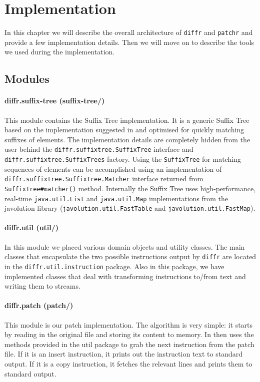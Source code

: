 \section{Implementation}

In this chapter we will describe the overall architecture of \texttt{diffr} and \texttt{patchr} and provide a few implementation details. Then we will move on to describe the tools we used during the implementation.

\subsection{Modules}

\paragraph{diffr.suffix-tree (suffix-tree/)}
This module contains the Suffix Tree implementation. It is a generic Suffix Tree based on the implementation suggested in \cite{Ukkonen95} and optimised for quickly matching suffixes of elements. The implementation details are completely hidden from the user behind the \texttt{diffr.suffixtree.SuffixTree} interface and \texttt{diffr.suffixtree.SuffixTrees} factory. Using the \texttt{SuffixTree} for matching sequences of elements can be accomplished using an implementation of \texttt{diffr.suffixtree.SuffixTree.Matcher} interface returned from \texttt{SuffixTree\#matcher()} method. Internally the Suffix Tree uses high-performance, real-time \texttt{java.util.List} and \texttt{java.util.Map} implementations from the javolution library (\texttt{javolution.util.FastTable} and \texttt{javolution.util.FastMap})\cite{javolution}. 

\paragraph{diffr.util (util/)}
In this module we placed various domain objects and utility classes. The main classes that encapsulate the two possible instructions output by \texttt{diffr} are located in the \texttt{diffr.util.instruction} package. Also in this package, we have implemented classes that deal with transforming instructions to/from text and writing them to streams.

\paragraph{diffr.patch (patch/)} 
This module is our patch implementation. The algorithm is very simple: it starts by reading in the original file and storing its content to memory. In then uses the methods provided in the util package to grab the next instruction from the patch file. If it is an insert instruction, it prints out the instruction text to standard output. If it is a copy instruction, it fetches the relevant lines and prints them to standard output.

